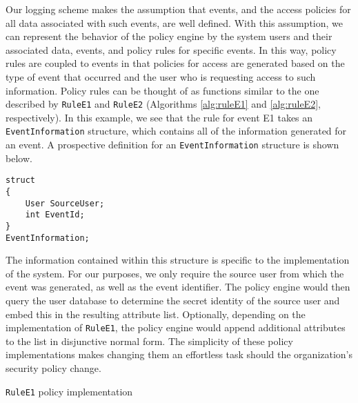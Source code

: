 \documentclass{sig-alternate}
\begin{document}

Our logging scheme makes the assumption that events, and the access policies for all data associated
with such events, are well defined. With this
assumption, we can represent the behavior of the policy engine by the system users and their associated
data, events, and policy rules for specific events. In this way, policy rules are coupled to events in that 
policies for access are generated based on the type of event that occurred and the user who is requesting 
access to such information. Policy rules can be thought of as functions similar to the one described by 
{\tt RuleE1} and {\tt RuleE2} (Algorithms \ref{alg:ruleE1} and \ref{alg:ruleE2}, respectively).
In this example, we see that the rule for event E1 
takes an {\tt EventInformation} structure, which contains
all of the information generated for an event. A prospective definition for an {\tt EventInformation} structure
is shown below.
\begin{lstlisting}
struct 
{
    User SourceUser;
    int EventId;
} 
EventInformation;
\end{lstlisting} 

The information contained within this structure is specific 
to the implementation of the system. For our purposes, we only require the source user from which the
event was generated, as well as the event identifier. The policy engine would then query the user
database to determine the secret identity of the source user and embed this in the resulting attribute
list. Optionally, depending on the implementation of {\tt RuleE1}, the policy engine would append additional
attributes to the list in disjunctive normal form. The simplicity of these policy implementations 
makes changing them an effortless task should the organization's security policy change.

\begin{algorithm}[t] %
\caption{{\tt RuleE1} policy implementation} \label{alg:ruleE1}
\begin{algorithmic}[1]
\end{algorithmic}
\end{algorithm}
\end{document}
